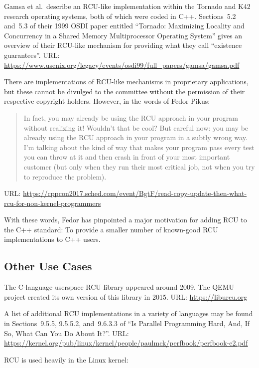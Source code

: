 Gamsa et al.~describe an RCU-like implementation within the Tornado
and K42 research operating systems, both of which were coded in C++.
Sections~5.2 and~5.3 of their 1999 OSDI paper entitled ``Tornado: Maximizing
Locality and Concurrency in a Shared Memory Multiprocessor Operating
System'' gives an overview of their RCU-like mechanism for providing
what they call ``existence guarantees''.
URL: \url{https://www.usenix.org/legacy/events/osdi99/full_papers/gamsa/gamsa.pdf}

There are implementations of RCU-like mechanisms in proprietary
applications, but these cannot be divulged to the committee without the
permission of their respective copyright holders.
However, in the words of Fedor Pikus:

\begin{quote}
	In fact, you may already be using the RCU approach in your program
	without realizing it! Wouldn't that be cool? But careful now:
	you may be already using the RCU approach in your program in a
	subtly wrong way. I'm talking about the kind of way that makes
	your program pass every test you can throw at it and then crash
	in front of your most important customer (but only when they
	run their most critical job, not when you try to reproduce
	the problem).
\end{quote}

URL: {\scriptsize \url{https://cppcon2017.sched.com/event/BgtF/read-copy-update-then-what-rcu-for-non-kernel-programmers}}

With these words, Fedor has pinpointed a major motivation for adding
RCU to the C++ standard: To provide a smaller number of known-good RCU
implementations to C++ users.

\subsection{Other Use Cases}
\label{sec:Other Use Cases}

The C-language userspace RCU library appeared around 2009.
The QEMU project created its own version of this library in 2015.
URL: \url{https://liburcu.org}

A list of additional RCU implementations in a variety of languages
may be found in Sections~9.5.5, 9.5.5.2, and~9.6.3.3 of
``Is Parallel Programming Hard, And, If So, What Can You Do About It?''.
URL: \url{https://kernel.org/pub/linux/kernel/people/paulmck/perfbook/perfbook-e2.pdf}

RCU is used heavily in the Linux kernel:

